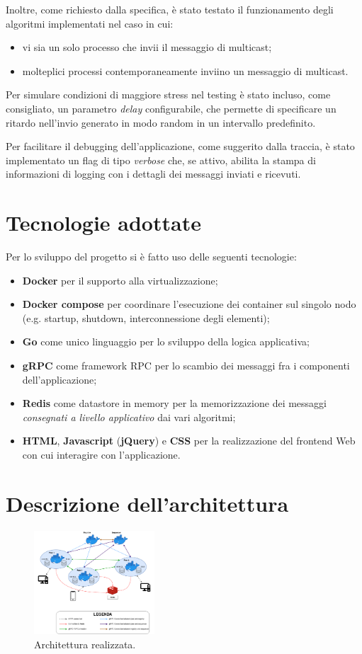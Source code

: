 \documentclass[conference]{IEEEtran}
\begin{document}
Inoltre, come richiesto dalla specifica, è stato testato il funzionamento degli algoritmi implementati nel caso in cui:
\begin{itemize}
\item vi sia un solo processo che invii il messaggio di multicast;
\item molteplici processi contemporaneamente inviino un messaggio di multicast.
\end{itemize}
Per simulare condizioni di maggiore stress nel testing è stato incluso, come consigliato, un parametro \textit{delay} configurabile, che permette di specificare un ritardo nell'invio generato in modo random in un intervallo predefinito.

Per facilitare il debugging dell'applicazione, come suggerito dalla traccia, è stato implementato un flag di tipo \textit{verbose} che, se attivo, abilita la stampa di informazioni di logging con i dettagli dei messaggi inviati e ricevuti.

\section{Tecnologie adottate}
Per lo sviluppo del progetto si è fatto uso delle seguenti tecnologie:
\begin{itemize}
\item \textbf{Docker} per il supporto alla virtualizzazione;
\item \textbf{Docker compose} per coordinare l'esecuzione dei container sul singolo nodo (e.g. startup, shutdown, interconnessione degli elementi);
\item \textbf{Go} come unico linguaggio per lo sviluppo della logica applicativa;
\item \textbf{gRPC} come framework RPC per lo scambio dei messaggi fra i componenti dell'applicazione;
\item \textbf{Redis} come datastore in memory per la memorizzazione dei messaggi \textit{consegnati a livello applicativo} dai vari algoritmi;
\item \textbf{HTML}, \textbf{Javascript} (\textbf{jQuery}) e \textbf{CSS} per la realizzazione del frontend Web con cui interagire con l'applicazione.
\end{itemize}

\section{Descrizione dell'architettura}
\begin{figure}[htbp]
\centerline{\includegraphics[width=0.4\textwidth]{figs/architecture.png}}
\caption{Architettura realizzata.}
\label{fig:architecture}
\end{figure}
\end{document}

